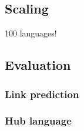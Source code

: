 \documentclass[twoside,11pt]{article}
\begin{document}
\subsection{Scaling}

100 languages!


\subsection{Evaluation}
 
\subsubsection{Link prediction}

\subsubsection{Hub language}
\end{document}
